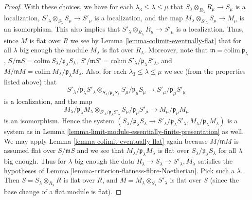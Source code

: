 \begin{proof}
\medskip\noindent
With these choices, we have for each $\lambda_3 \leq \lambda \leq \mu$
that $S_\lambda \otimes_{R_{\lambda}} R_\mu \to S_\mu$ is a localization,
$S'_\lambda \otimes_{S_{\lambda}} S_\mu \to S'_\mu$ is a localization, and
the map $M_\lambda \otimes_{S'_\lambda} S_\mu \to M_\mu$ is an
isomorphism. This also implies that
$S'_\lambda \otimes_{R_{\lambda}} R_\mu \to S'_\mu$ is a localization.
Thus, since $M$ is flat over $R$ we see by
Lemma \ref{lemma-colimit-eventually-flat} that
for all $\lambda$ big enough the module $M_\lambda$ is
flat over $R_\lambda$.
Moreover, note that
$
\mathfrak m = \text{colim}\ \mathfrak p_\lambda
$,
$
S/\mathfrak mS = \text{colim}\ S_\lambda/\mathfrak p_\lambda S_\lambda
$,
$
S'/\mathfrak mS' = \text{colim}\ S'_\lambda/\mathfrak p_\lambda S'_\lambda
$,
and
$
M/\mathfrak mM = \text{colim}\ M_\lambda/\mathfrak p_\lambda M_\lambda
$. Also, for each $\lambda_3 \leq \lambda \leq \mu$ we see (from the
properties listed above) that
$$
S'_\lambda/\mathfrak p_\lambda S'_\lambda
\otimes_{S_{\lambda}/\mathfrak p_\lambda S_\lambda}
S_\mu/\mathfrak p_\mu S_\mu
\longrightarrow
S'_\mu/\mathfrak p_\mu S'_\mu
$$
is a localization, and the map
$$
M_\lambda / \mathfrak p_\lambda M_\lambda
\otimes_{S'_\lambda/\mathfrak p_\lambda S'_\lambda}
S_\mu /\mathfrak p_\mu S'_\mu
\longrightarrow
M_\mu/\mathfrak p_\mu M_\mu
$$
is an isomorphism. Hence the system
$(S_\lambda/\mathfrak p_\lambda S_\lambda \to
S'_\lambda/\mathfrak p_\lambda S'_\lambda,
M_\lambda/\mathfrak p_\lambda M_\lambda)$
is a system as in
Lemma \ref{lemma-limit-module-essentially-finite-presentation} as well.
We may apply Lemma \ref{lemma-colimit-eventually-flat} again because
$M/\mathfrak m M$ is assumed flat over $S/\mathfrak mS$ and we see that
$M_\lambda/\mathfrak p_\lambda M_\lambda$ is flat over
$S_\lambda/\mathfrak p_\lambda S_\lambda$ for all $\lambda$ big enough.
Thus for $\lambda$ big enough the data
$R_\lambda \to S_\lambda \to S'_\lambda, M_\lambda$ satisfies
the hypotheses of Lemma \ref{lemma-criterion-flatness-fibre-Noetherian}.
Pick such a $\lambda$. Then $S = S_\lambda\otimes_{R_\lambda} R$
is flat over $R$, and $M = M_\lambda \otimes_{S_\lambda} S'_{\lambda}$
is flat over $S$ (since the base change of a flat module is flat).
\end{proof}

















